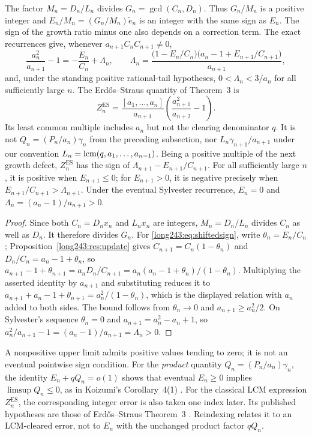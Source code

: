 \documentclass[11pt]{article}
\begin{document}
\begin{proposition}\label{long243:res:classicalhalfspace}
The factor $M_n=D_n/L_n$ divides $G_n=\gcd(C_n,D_n)$. Thus $G_n/M_n$
is a positive integer and $E_n/M_n=(G_n/M_n)\tilde e_n$ is an integer
with the same sign as $E_n$. The sign of the growth ratio minus one also
depends on a correction term. The exact recurrences give, whenever
$a_{n+1}C_nC_{n+1}\ne0$,
\begin{equation}\label{long243:eq:shiftedsign}
 \frac{a_n^2}{a_{n+1}}-1=-\frac{E_n}{C_n}+\Lambda_n,
 \qquad
 \Lambda_n=\frac{\bigl(1-E_n/C_n\bigr)\bigl(a_n-1+E_{n+1}/C_{n+1}\bigr)}{a_{n+1}},
\end{equation}
and, under the standing positive rational-tail hypotheses,
$0<\Lambda_n<3/a_n$ for all sufficiently large $n$. The
Erd\H{o}s--Straus quantity of Theorem~3 is
\[
 Z_n^{\mathrm{ES}}=
 \frac{[a_1,\ldots,a_n]}{a_{n+1}}
 \left(\frac{a_{n+1}^2}{a_{n+2}}-1\right).
\]
Its least common multiple includes $a_n$ but not the clearing
denominator $q$. It is not $Q_n=(P_n/a_n)\gamma_n$ from the preceding subsection,
nor $L_n\gamma_{n+1}/a_{n+1}$ under our convention
$L_n=\operatorname{lcm}(q,a_1,\ldots,a_{n-1})$.
Being a positive multiple of the next growth defect, $Z_n^{\mathrm{ES}}$
has the sign of $\Lambda_{n+1}-E_{n+1}/C_{n+1}$. For all sufficiently
large $n$, it is positive when $E_{n+1}\le0$; for $E_{n+1}>0$, it is
negative precisely when
$E_{n+1}/C_{n+1}>\Lambda_{n+1}$. Under the eventual Sylvester recurrence, $E_n=0$ and
$\Lambda_n=(a_n-1)/a_{n+1}>0$.
\end{proposition}

\begin{proof}
Since both $C_n=D_nx_n$ and $L_nx_n$ are integers, $M_n=D_n/L_n$
divides $C_n$ as well as $D_n$. It therefore divides $G_n$.  For \eqref{long243:eq:shiftedsign}, write
$\theta_n=E_n/C_n$; Proposition~\ref{long243:res:update} gives $C_{n+1}=C_n(1-\theta_n)$
and $D_n/C_n=a_n-1+\theta_n$, so
$a_{n+1}-1+\theta_{n+1}=a_nD_n/C_{n+1}=a_n(a_n-1+\theta_n)/(1-\theta_n)$.
Multiplying the asserted identity by $a_{n+1}$ and substituting reduces it to
$a_{n+1}+a_n-1+\theta_{n+1}=a_n^2/(1-\theta_n)$, which is the displayed
relation with $a_n$ added to both sides.  The bound follows from
$\theta_n\to0$ and $a_{n+1}\ge a_n^2/2$.  On Sylvester's sequence
$\theta_n=0$ and $a_{n+1}=a_n^2-a_n+1$, so
$a_n^2/a_{n+1}-1=(a_n-1)/a_{n+1}=\Lambda_n>0$.
\end{proof}


A nonpositive upper limit admits positive values tending to zero; it is
not an eventual pointwise sign condition. For the \emph{product} quantity
$Q_n=(P_n/a_n)\gamma_n$, the identity $E_n+qQ_n=o(1)$ shows that eventual
$E_n\ge0$ implies $\limsup Q_n\le0$, as in Koizumi's Corollary~4(1)
\cite[pp.~14--15]{koizumi2025}.
For the classical LCM expression $Z_n^{\mathrm{ES}}$, the corresponding
integer error is also taken one index later. Its published hypotheses are
those of Erd\H{o}s--Straus Theorem~3
\cite[p.~132]{erdosstraus1964}. Reindexing relates it to an LCM-cleared
error, not to $E_n$ with the unchanged product factor $qQ_n$.
\end{document}
